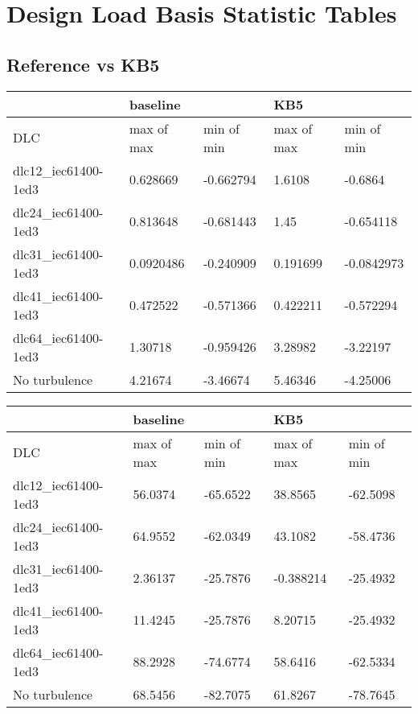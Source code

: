 \chapter{Design Load Basis Statistic Tables}
\section{Reference vs KB5}
\label{tables:baseline-vs-KB6}

\begin{tabular}{lllll}
\toprule
                     & \multicolumn{2}{l}{baseline} &         KB5 &\\
\midrule
                 DLC &  max of max &  min of min &  max of max &  min of min \\
 dlc12\_iec61400-1ed3 &    0.628669 &   -0.662794 &      1.6108 &     -0.6864 \\
 dlc24\_iec61400-1ed3 &    0.813648 &   -0.681443 &        1.45 &   -0.654118 \\
 dlc31\_iec61400-1ed3 &   0.0920486 &   -0.240909 &    0.191699 &  -0.0842973 \\
 dlc41\_iec61400-1ed3 &    0.472522 &   -0.571366 &    0.422211 &   -0.572294 \\
 dlc64\_iec61400-1ed3 &     1.30718 &   -0.959426 &     3.28982 &    -3.22197 \\
    No turbulence &     4.21674 &    -3.46674 &     5.46346 &    -4.25006 \\
\bottomrule
\end{tabular}


\begin{tabular}{lllll}
\toprule
                     & \multicolumn{2}{l}{baseline} &         KB5 &\\
\midrule
                 DLC &  max of max &  min of min &  max of max &  min of min \\
 dlc12\_iec61400-1ed3 &     56.0374 &    -65.6522 &     38.8565 &    -62.5098 \\
 dlc24\_iec61400-1ed3 &     64.9552 &    -62.0349 &     43.1082 &    -58.4736 \\
 dlc31\_iec61400-1ed3 &     2.36137 &    -25.7876 &   -0.388214 &    -25.4932 \\
 dlc41\_iec61400-1ed3 &     11.4245 &    -25.7876 &     8.20715 &    -25.4932 \\
 dlc64\_iec61400-1ed3 &     88.2928 &    -74.6774 &     58.6416 &    -62.5334 \\
    No turbulence &     68.5456 &    -82.7075 &     61.8267 &    -78.7645 \\
\bottomrule
\end{tabular}


